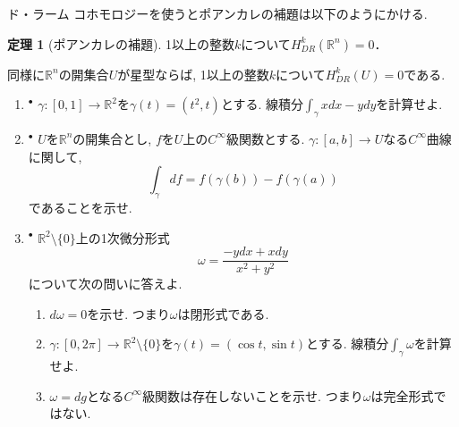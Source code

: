 \documentclass[dvipdfmx,a4paper,11pt]{article}
\newcommand{\R}{\mathbb{R}}
\theoremstyle{definition}
\newtheorem{thm}{定理}
\begin{document}
ド・ラーム コホモロジーを使うとポアンカレの補題は以下のようにかける. 
 \begin{tcolorbox}[
    colback = white,
    colframe = green!35!black,
    fonttitle = \bfseries,
    breakable = true]
\begin{thm}[ポアンカレの補題]
1以上の整数$k$について$H^{k}_{DR}(\R^n) =0$．
   \end{thm}
    \end{tcolorbox}
同様に$\R^n$の開集合$U$が星型ならば, 1以上の整数$k$について$H^{k}_{DR}(U) =0$である. 
\vspace{11pt}
\begin{enumerate}[label=\textbf{問}\ref*{sec-Rn-diff-ap}.\arabic*]



\newpage 


\item $^{\bullet}$ $\gamma : [0, 1] \to \R^{2}$を$\gamma(t) = (t^2,  t)$とする. 
線積分$\int_{\gamma} xdx - ydy$を計算せよ.

\item $^{\bullet}$ $U$を$\R^n$の開集合とし, $f$を$U$上の$C^\infty$級関数とする. 
$\gamma : [a,b] \to U$なる$C^\infty$曲線に関して, 
$$
\int_{\gamma} df = f(\gamma(b)) - f(\gamma (a))
$$
であることを示せ. 


\item $^{\bullet}$ $\R^{2} \setminus \{0\}$上の1次微分形式
$$
\omega = \frac{-ydx + x dy}{x^2+y^2}
$$
について次の問いに答えよ.
\begin{enumerate}
 \setlength{\parskip}{0cm}
  \setlength{\itemsep}{2pt} 
\item $d \omega=0$を示せ. つまり$\omega$は閉形式である. 
\item $\gamma : [0, 2\pi] \to \R^{2} \setminus \{0\} $を$\gamma(t) = (\cos t, \sin t)$とする. 
線積分$\int_{\gamma} \omega $を計算せよ. 
\item $\omega = d g$となる$C^{\infty}$級関数は存在しないことを示せ. つまり$\omega$は完全形式ではない. 
\end{enumerate}



\end{enumerate}
\end{document}
